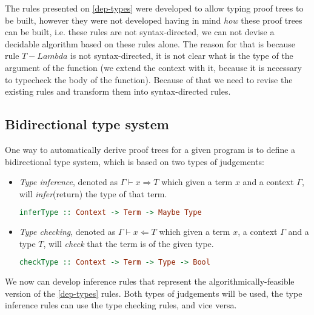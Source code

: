 \documentclass[12pt]{article}
\theoremstyle{definition}
\newcommand{\infers}{\Rightarrow}
\newcommand{\checks}{\Leftarrow}
\begin{document}
The rules presented on \autoref{dep-types} were developed to allow typing proof trees to be built, however they were not developed having in mind \emph{how} these proof trees can be built, i.e. these rules are not syntax-directed, we can not devise a decidable algorithm based on these rules alone.
The reason for that is because rule $T-Lambda$ is not syntax-directed, it is not clear what is the type of the argument of the function (we extend the context with it, because it is necessary to typecheck the body of the function).
Because of that we need to revise the existing rules and transform them into syntax-directed rules.

\subsection{Bidirectional type system}

One way to automatically derive proof trees for a given program is to define a bidirectional type system, which is based on two types of judgements:
\begin{itemize}
       \item \emph{Type inference}, denoted as $\Gamma \vdash x \infers T$ which given a term $x$ and a context $\Gamma$, will \emph{infer}(return) the type of that term.
             \begin{lstlisting}[language=Haskell,numbers=none]
                    inferType :: Context -> Term -> Maybe Type
             \end{lstlisting}
       \item \emph{Type checking}, denoted as $\Gamma \vdash x \checks T$ which given a term $x$, a context $\Gamma$ and a type $T$, will \emph{check} that the term is of the given type.
             \begin{lstlisting}[language=Haskell,numbers=none]
                    checkType :: Context -> Term -> Type -> Bool
             \end{lstlisting}
\end{itemize}

We now can develop inference rules that represent the algorithmically-feasible version of the \autoref{dep-types} rules. Both types of judgements will be used, the type inference rules can use the type checking rules, and vice versa.
\end{document}
